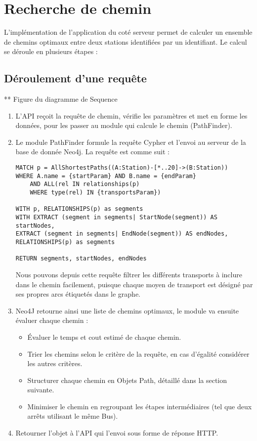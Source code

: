 \section{Recherche de chemin}
	L'implémentation de l'application du coté serveur permet de calculer un ensemble de chemins optimaux entre deux stations identifiées par un identifiant. Le calcul se déroule en plusieurs étapes :
	\subsection{Déroulement d'une requête}
		** Figure du diagramme de Sequence
		\begin{enumerate}
		\item L'API reçoit la requête de chemin, vérifie les paramètres et met en forme les données, pour les passer au module qui calcule le chemin (PathFinder).
		\item Le module PathFinder formule la requête Cypher et l'envoi au serveur de la base de donnée Neo4j.
		La requête est comme suit : 		
\begin{lstlisting}[style=cypher, caption=Requête Cypher des plus courts chemins]
MATCH p = AllShortestPaths((A:Station)-[*..20]->(B:Station))
WHERE A.name = {startParam} AND B.name = {endParam}
	AND ALL(rel IN relationships(p) 
	WHERE type(rel) IN {transportsParam})

WITH p, RELATIONSHIPS(p) as segments
WITH EXTRACT (segment in segments| StartNode(segment)) AS startNodes,
EXTRACT (segment in segments| EndNode(segment)) AS endNodes,
RELATIONSHIPS(p) as segments
            
RETURN segments, startNodes, endNodes
\end{lstlisting}
			Nous pouvons depuis cette requête filtrer les différents transports à inclure dans le chemin facilement, puisque chaque moyen de transport est désigné par ses propres arcs étiquetés dans le graphe.
		\item Neo4J retourne ainsi une liste de chemins optimaux, le module va ensuite évaluer chaque chemin :
			\begin{itemize}
			\item Évaluer le temps et cout estimé de chaque chemin.
			\item Trier les chemins selon le critère de la requête, en cas d'égalité considérer les autres critères.
			\item Structurer chaque chemin en Objets Path, détaillé dans la section suivante.
			\item Minimiser le chemin en regroupant les étapes intermédiaires (tel que deux arrêts utilisant le même Bus).
			\end{itemize}
		\item Retourner l'objet à l'API qui l'envoi sous forme de réponse HTTP.
		\end{enumerate}
\label{SectionPathFinding}
	
